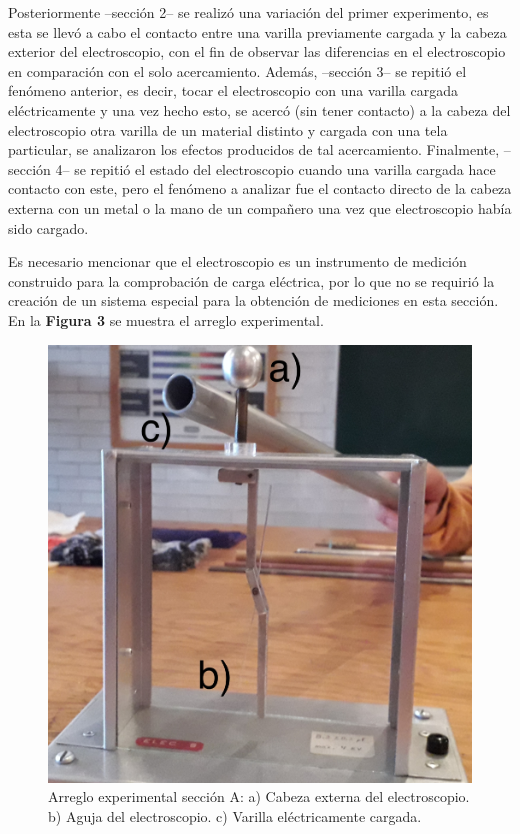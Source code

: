 \documentclass[letterpaper, 11 pt]{article}
\begin{document}
\begin{multicols*}{2}
Posteriormente --sección 2-- se realizó una variación del primer experimento, es esta se llevó a cabo el contacto entre una varilla previamente cargada y la cabeza exterior del electroscopio, con el fin de observar las diferencias en el electroscopio en comparación con el solo acercamiento. Además, --sección 3-- se repitió el fenómeno anterior, es decir, tocar el electroscopio con una varilla cargada eléctricamente y una vez hecho esto, se acercó (sin tener contacto) a la cabeza del electroscopio otra varilla de un material distinto y cargada con una tela particular, se analizaron los efectos producidos de tal acercamiento. Finalmente, --sección 4-- se repitió el estado del electroscopio cuando una varilla cargada hace contacto con este, pero el fenómeno a analizar fue el contacto directo de la cabeza externa con un metal o la mano de un compañero una vez que electroscopio había sido cargado.

Es necesario mencionar que el electroscopio es un instrumento de medición construido para la comprobación de carga eléctrica, por lo que no se requirió la creación de un sistema especial para la obtención de mediciones en esta sección. En la \textbf{Figura 3} se muestra el arreglo experimental.





\begin{figure}[H]
\includegraphics[scale=0.08]{electroscopio.jpg}
\centering
\small{\caption{Arreglo experimental sección A: a) Cabeza externa del electroscopio. b)  Aguja del electroscopio. c) Varilla eléctricamente cargada.}}
\end{figure}


\end{multicols*}
\end{document}
